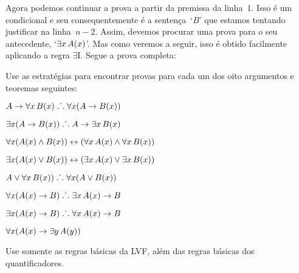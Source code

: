 \begin{fitchproof}
	\open
	\ellipsesline
	\close
\end{fitchproof}
Agora podemos continuar a prova a partir da premissa da linha~$1$. Isso \'e um condicional e seu consequentemente \'e a senten\c ca~`$B$' que estamos tentando justificar na linha~$n-2$. Assim, devemos procurar uma prova para o seu antecedente, `$\exists x\,\mathord{A}(x)$'. Mas  como veremos a seguir, isso \'e obtido  facilmente aplicando a regra  $\exists$I.   Segue a prova completa:\begin{fitchproof}
	\open
	\close
\end{fitchproof}

\practiceproblems

\problempart
Use as estrat\'egias  para encontrar provas para cada um dos oito argumentos e teoremas seguintes:
 
\begin{earg}
\item $A \rightarrow \forall x\,\mathord{B}(x) \mathrel{\ldotp\dot{}\,\ldotp} \forall x(A \rightarrow \mathord{B}(x))$
\item $\exists x(A \rightarrow \mathord{B}(x)) \mathrel{\ldotp\dot{}\,\ldotp} A \rightarrow \exists x\, \mathord{B}(x)$
\item $\forall x(\mathord{A}(x) \wedge \mathord{B}(x)) \leftrightarrow (\forall x\,\mathord{A}(x) \wedge \forall x\,\mathord{B}(x))$
\item $\exists x(\mathord{A}(x) \vee \mathord{B}(x)) \leftrightarrow (\exists x\,\mathord{A}(x) \vee \exists x\,\mathord{B}(x))$
\item $A \vee \forall x\,\mathord{B}(x)) \mathrel{\ldotp\dot{}\,\ldotp} \forall x(A \vee \mathord{B}(x))$
\item $\forall x(\mathord{A}(x) \rightarrow B) \mathrel{\ldotp\dot{}\,\ldotp} \exists x\,\mathord{A}(x) \rightarrow B$
\item $\exists x(\mathord{A}(x) \rightarrow B) \mathrel{\ldotp\dot{}\,\ldotp} \forall x\,\mathord{A}(x) \rightarrow B$
\item $\forall x(\mathord{A}(x) \rightarrow \exists y\,\mathord{A}(y))$
\end{earg}
Use somente as regras b\'asicas da LVF, al\'em das regras b\'asicas dos quantificadores.

